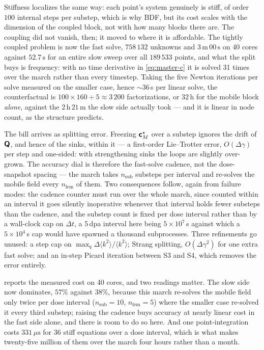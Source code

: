Stiffness localizes the same way: each point's system genuinely is stiff, of
order $100$ internal steps per substep, which is why BDF, but its cost scales
with the dimension of the coupled block, not with how many blocks there are. The coupling did not vanish, then; it moved to where it is affordable. The
tightly coupled problem is now the fast solve, $758\,132$ unknowns and
$3\,\mathrm{m}\,00\,\mathrm{s}$ on 40 cores against
$52.7\,\mathrm{s}$ for an entire slow sweep over all $189\,533$
points, and what the split buys is frequency: with no time derivative in
\cref{eq:master-c} it is solved 31 times over the march rather than every
timestep. Taking the five Newton iterations per solve measured on the smaller
case, hence $\sim36\,$s per linear solve, the counterfactual is
$100\times160\div5\approx3\,200$ factorizations, or $32\,$h for the mobile
block \emph{alone}, against the $2\,\mathrm{h}\,21\,\mathrm{m}$ the slow side
actually took --- and it is linear in node count, as the structure predicts.

The bill arrives as splitting error. Freezing $\bm{\mathsf{c}}^{\star}_M$ over a
substep ignores the drift of $\bm{\mathsf{Q}}$, and hence of the sinks, within it --- a
first-order Lie--Trotter error, $O(\Delta\gamma)$ per step and one-sided: with
strengthening sinks the loops are slightly over-grown. The accuracy dial is
therefore the fast-solve cadence, not the dose-snapshot spacing --- the march
takes $n_{\mathrm{sub}}$ substeps per interval and re-solves the mobile field
every $n_{\mathrm{fem}}$ of them. Two consequences follow, again
from failure modes: the cadence counter must run over the whole march, since
counted within an interval it goes silently inoperative whenever that interval
holds fewer substeps than the cadence, and the substep count is fixed per dose
interval rather than by a wall-clock cap on $\Delta t$, a 5\,dpa interval here
being $5\times10^{7}\,$s against which a $5\times10^{4}\,$s cap would have
spawned a thousand subprocesses. Three refinements go unused: a step cap on
$\max_q\Delta\langle k^{2}\rangle/\langle k^{2}\rangle$; Strang splitting,
$O(\Delta\gamma^{2})$ for one extra fast solve; and an in-step Picard iteration
between S3 and S4, which removes the error entirely.

 reports the measured cost on 40 cores, and two readings matter.
The slow side now dominates, $57\%$ against $38\%$, because this march re-solves
the mobile field only twice per dose interval
($n_{\mathrm{sub}}=10$, $n_{\mathrm{fem}}=5$) where the smaller case re-solved
it every third substep; raising the cadence buys accuracy at nearly linear cost
in the fast side alone, and there is room to do so here. And one
point-integration costs $331\,\mu\mathrm s$ for $36$ stiff equations over a dose
interval, which is what makes twenty-five million of them over the march four
hours rather than a month.

